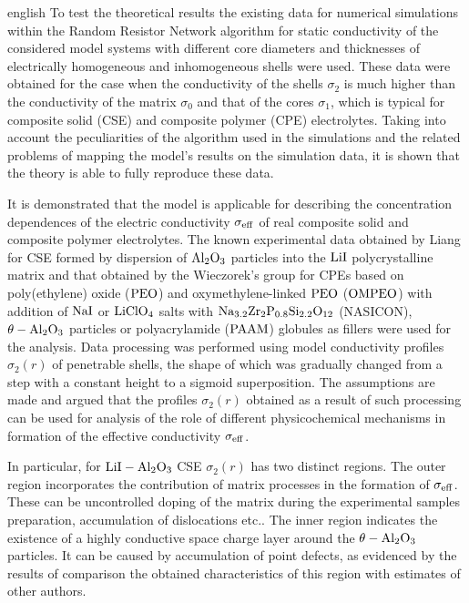 \begin{otherlanguage*}{english}
To test the theoretical results the existing data for numerical simulations within the Random Resistor Network algorithm for static conductivity of the considered model systems with different core diameters and thicknesses of electrically homogeneous and inhomogeneous shells were used. These data were obtained for the case when the conductivity of the shells $ \sigma_2 $ is much higher than the conductivity of the matrix $ \sigma_0 $ and that of the cores $ \sigma_1 $, which is typical for composite solid (CSE) and composite polymer  (CPE) electrolytes.
Taking into account the peculiarities of the algorithm used in the simulations and the related problems of mapping the model's results on the simulation data, it is shown that the theory is able to fully reproduce these data.

It is demonstrated that the model is applicable for describing the concentration dependences of the electric conductivity $ \sigma_ {\rm eff} $ of real  composite solid and composite  polymer electrolytes.
The known experimental data obtained by Liang for CSE formed by dispersion of  $ \rm Al_2O_3 $ particles into the  $ \rm LiI $ polycrystalline matrix and that obtained by the Wieczorek's group for CPEs based on poly(ethylene) oxide ($ \rm PEO $) and oxymethylene-linked  $ \rm PEO $ ($ \rm OMPEO $) with addition of $ \rm NaI $ or $ \rm LiClO_4 $ salts with $ \rm Na_ {3.2} Zr_2P_ {0.8} Si_ { 2.2} O_ {12} $ (NASICON), $ \rm \theta-Al_2O_3 $ particles  or polyacrylamide ($ \rm PAAM $) globules as fillers  were used for the analysis.
Data processing was performed using model conductivity profiles $ \sigma_2 (r) $ of penetrable shells, the shape of which was gradually changed from a step with a constant height to a sigmoid superposition.
The assumptions are made and argued that the profiles $ \sigma_2 (r) $ obtained as a result of such processing can be used for analysis of the role of different physicochemical mechanisms in formation of the effective conductivity $ \sigma_ {\rm eff} $.

In particular, for $ \rm LiI-Al_2O_3 $ CSE $ \sigma_2 (r) $ has two  distinct regions. The outer region incorporates the contribution of matrix processes in the formation of $ \sigma _ {\rm eff} $. These can be uncontrolled doping of the matrix during the  experimental samples preparation, accumulation of dislocations etc.. The inner region indicates the existence of a highly conductive space charge layer around the $ \rm \theta-Al_2O_3 $ particles. It can be caused by accumulation of point defects, as evidenced by the results of comparison the obtained characteristics of this region with estimates of other authors.


\end{otherlanguage*}
